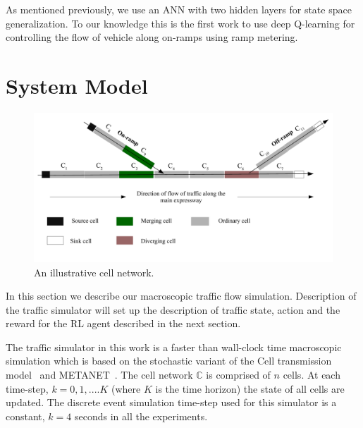 \documentclass[conference]{IEEEtran}
\begin{document}
As mentioned previously, we use an \ac{ANN} with two hidden layers for state space generalization. To our knowledge this is the first work to use deep Q-learning for controlling the flow of vehicle along on-ramps using ramp metering.

 \section{System Model}
\label{sec:traffic-sim}

\begin{figure}[!htbp]
	\centering
	\includegraphics[scale=0.5]{images/cellNetwork.pdf}
	
	\caption{An illustrative cell network.}
	\label{fig:cell-network}
\end{figure}

In this section we describe our macroscopic traffic flow simulation. Description of the traffic simulator will set up the description of traffic state, action and the reward for the RL agent described in the next section.

The traffic simulator in this work is a faster than wall-clock time macroscopic simulation which is based on the stochastic variant of the Cell transmission model~\cite{boel2006compositional} and METANET~\cite{kotsialos2002traffic}. The cell network $\mathbb{C}$ is comprised of $n$ cells. At each time-step, $k=0,1, .... K$ (where $K$ is the time horizon) the state of all cells are updated. The discrete event simulation time-step used for this simulator is a constant, $k=4$ seconds in all the experiments.
\end{document}
